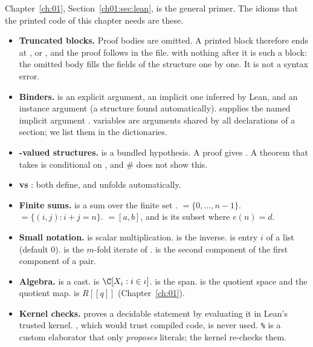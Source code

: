 Chapter~\ref{ch:01}, Section~\ref{ch01:sec:lean}, is the general primer. The idioms that the printed code of this
chapter needs are these.
\begin{itemize}
\item \textbf{Truncated blocks.} Proof bodies are omitted. A printed block therefore ends at \lean{:=},
   or , and the proof follows in the file.  with nothing after
  it is such a block: the omitted body fills the fields of the structure  one by one. It is not a syntax
  error.
\item \textbf{Binders.}  is an explicit argument,  an implicit one inferred by Lean, and
  \lean{[Field K]} an instance argument (a structure found automatically).  supplies the named
  implicit argument .  variables are arguments shared by all declarations of a section; we
  list them in the dictionaries.
\item \textbf{-valued structures.}  is a bundled hypothesis. A
  proof  gives . A theorem that takes  is conditional on , and
  \# does not show this.
\item \textbf{ vs }: both define, and  unfolds automatically.
\item \textbf{Finite sums.}  is a sum over the finite set . 
  $=\{0,\dots,n-1\}$.  $=\{(i,j):i+j=n\}$.  $=[a,b]$, and
   is its subset where $e(n)=d$.
\item \textbf{Small notation.}  is scalar multiplication.  is the inverse.  is
  entry $i$ of a list (default $0$).  is the $m$-fold iterate of .  is the second
  component of the first component of a pair.
\item \textbf{Algebra.}  is a cast.  is $\C[X_i:i\in\iota]$.
   is the span.  is the quotient space and  the quotient map.
   is $R[[q]]$ (Chapter~\ref{ch:01}).
\item \textbf{Kernel checks.}  proves a decidable statement by evaluating it in Lean's trusted
  kernel. , which would trust compiled code, is never used. \texttt{\%} is a custom
  elaborator that only \emph{proposes} literals; the kernel re-checks them.
\end{itemize}

